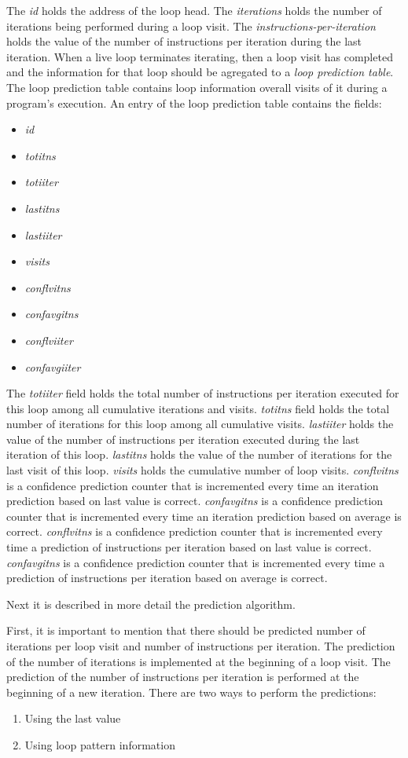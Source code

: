 \documentclass[11pt]{article}
\begin{document}
The {\it id} holds the address of the loop head. The {\it iterations} holds the number of iterations being performed during a loop visit. The {\it instructions-per-iteration} holds the value of the number of instructions per iteration during the last iteration. 
When a live loop terminates iterating, then a loop visit has completed and the information for that loop should be agregated to a {\it loop prediction table}. The loop prediction table contains loop information overall visits of it during a program's execution. An entry of the loop prediction table contains the fields:
\begin{itemize}
\item{{\it id}}
\item{{\it totitns}}
\item{{\it totiiter}}
\item{{\it lastitns}}
\item{{\it lastiiter}}
\item{{\it visits}}
\item{{\it conflvitns}}
\item{{\it confavgitns}}
\item{{\it conflviiter}}
\item{{\it confavgiiter}}
\end{itemize}
The {\it totiiter} field holds the total number of instructions per iteration executed for this loop among all cumulative iterations and visits.
{\it totitns} field holds the total number of iterations for this loop among all cumulative visits.
{\it lastiiter} holds the value of the number of instructions per iteration executed during the last iteration of this loop.
{\it lastitns} holds the value of the number of iterations for the last visit of this loop.
{\it visits} holds the cumulative number of loop visits.
{\it conflvitns} is a confidence prediction counter that is incremented every time an iteration prediction based on last value is correct.
{\it confavgitns} is a confidence prediction counter that is incremented every time an iteration prediction based on average is correct.
{\it conflvitns} is a confidence prediction counter that is incremented every time a prediction of instructions per iteration based on last value is correct.
{\it confavgitns} is a confidence prediction counter that is incremented every time a prediction  of instructions per iteration based on average is correct.

Next it is described in more detail the prediction algorithm.

First, it is important to mention that there should be predicted number of iterations per loop visit and number of instructions per iteration. 
The prediction of the number of iterations is implemented at the beginning of a loop visit. 
The prediction of the number of instructions per iteration is performed at the beginning of a new iteration. 
There are two ways to perform the predictions:
\begin{enumerate}
\item{Using the last value}
\item{Using loop pattern information}
\end{enumerate}
\end{document}
